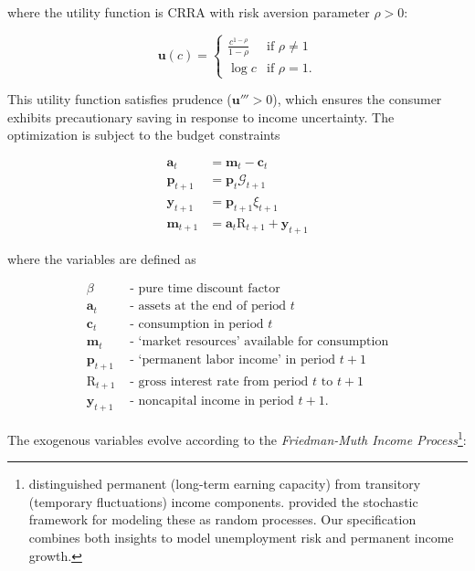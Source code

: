\documentclass[twocolumn, switch]{article}
\newcommand{\DiscFac}{\beta}
\newcommand{\cLvl}{\mathbf{c}}
\newcommand{\uFunc}{\mathbf{u}}
\newcommand{\CRRA}{\rho}
\newcommand{\cNrm}{c}
\newcommand{\Rfree}{\text{R}}
\newcommand{\PermGroShk}{\mathcal{G}}
\newcommand{\tranShk}{\xi}
\newcommand{\aLvl}{\mathbf{a}}
\newcommand{\mLvl}{\mathbf{m}}
\newcommand{\pLvl}{\mathbf{p}}
\newcommand{\yLvl}{\mathbf{y}}
\begin{document}
where the utility function is CRRA with risk aversion parameter $\CRRA > 0$:

\begin{equation}
\label{eq:UtilityFunc}
\uFunc(\cNrm) = \begin{cases}
\frac{\cNrm^{1-\CRRA}}{1-\CRRA} & \text{if } \CRRA \neq 1 \\
\log \cNrm & \text{if } \CRRA = 1.
\end{cases}
\end{equation}

This utility function satisfies prudence ($\uFunc''' > 0$), which ensures the consumer exhibits precautionary saving in response to income uncertainty. The optimization is subject to the budget constraints

\begin{equation}
\label{eq:DBCLevel}
\begin{aligned}
\aLvl_{t}  &= \mLvl_{t}-\cLvl_{t} \\
\pLvl_{t+1}  &= \pLvl_{t} \PermGroShk_{t+1}  \\
\yLvl_{t+1}  &= \pLvl_{t+1}\tranShk_{t+1} \\
\mLvl_{t+1}  &= \aLvl_{t}\Rfree_{t+1} + \yLvl_{t+1}
\end{aligned}
\end{equation}

where the variables are defined as

\begin{equation}
\begin{aligned}
\DiscFac &\text{ - pure time discount factor} \\
\aLvl_{t} &\text{ - assets at the end of period } t \\
\cLvl_{t} &\text{ - consumption in period } t \\
\mLvl_{t} &\text{ - `market resources' available for consumption} \\
\pLvl_{t+1} &\text{ - `permanent labor income' in period } t+1 \\
\Rfree_{t+1} &\text{ - gross interest rate from period } t \text{ to } t+1 \\
\yLvl_{t+1} &\text{ - noncapital income in period } t+1.
\end{aligned}
\end{equation}

The exogenous variables evolve according to the \textit{Friedman-Muth Income Process}\footnote{\citet{Friedman1957} distinguished permanent (long-term earning capacity) from transitory (temporary fluctuations) income components. \citet{Muth1960} provided the stochastic framework for modeling these as random processes. Our specification combines both insights to model unemployment risk and permanent income growth.}:
\end{document}
